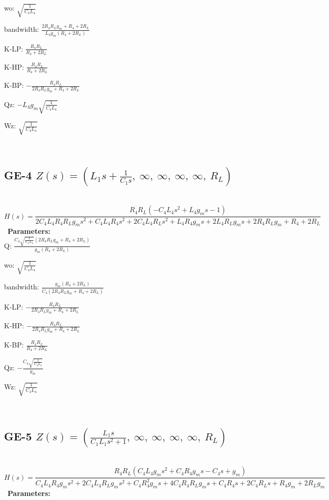 \documentclass{article}
\begin{document}
wo: $\sqrt{\frac{1}{C_{4} L_{4}}}$\ 

bandwidth: $\frac{2 R_{4} R_{L} g_{m} + R_{4} + 2 R_{L}}{L_{4} g_{m} \left(R_{4} + 2 R_{L}\right)}$\ 

K-LP: $\frac{R_{4} R_{L}}{R_{4} + 2 R_{L}}$\ 

K-HP: $\frac{R_{4} R_{L}}{R_{4} + 2 R_{L}}$\ 

K-BP: $- \frac{R_{4} R_{L}}{2 R_{4} R_{L} g_{m} + R_{4} + 2 R_{L}}$\ 

Qz: $- L_{4} g_{m} \sqrt{\frac{1}{C_{4} L_{4}}}$\ 

Wz: $\sqrt{\frac{1}{C_{4} L_{4}}}$\ 

\ 

\subsection{GE-4 $Z(s) = \left( L_{1} s + \frac{1}{C_{1} s}, \  \infty, \  \infty, \  \infty, \  \infty, \  R_{L}\right)$ } \ 
\textbf{\[H(s) = \frac{R_{4} R_{L} \left(- C_{4} L_{4} s^{2} + L_{4} g_{m} s - 1\right)}{2 C_{4} L_{4} R_{4} R_{L} g_{m} s^{2} + C_{4} L_{4} R_{4} s^{2} + 2 C_{4} L_{4} R_{L} s^{2} + L_{4} R_{4} g_{m} s + 2 L_{4} R_{L} g_{m} s + 2 R_{4} R_{L} g_{m} + R_{4} + 2 R_{L}}\] } \ 
\textbf{Parameters:}\\ 

Q: $\frac{C_{4} \sqrt{\frac{1}{C_{4} L_{4}}} \left(2 R_{4} R_{L} g_{m} + R_{4} + 2 R_{L}\right)}{g_{m} \left(R_{4} + 2 R_{L}\right)}$\ 

wo: $\sqrt{\frac{1}{C_{4} L_{4}}}$\ 

bandwidth: $\frac{g_{m} \left(R_{4} + 2 R_{L}\right)}{C_{4} \left(2 R_{4} R_{L} g_{m} + R_{4} + 2 R_{L}\right)}$\ 

K-LP: $- \frac{R_{4} R_{L}}{2 R_{4} R_{L} g_{m} + R_{4} + 2 R_{L}}$\ 

K-HP: $- \frac{R_{4} R_{L}}{2 R_{4} R_{L} g_{m} + R_{4} + 2 R_{L}}$\ 

K-BP: $\frac{R_{4} R_{L}}{R_{4} + 2 R_{L}}$\ 

Qz: $- \frac{C_{4} \sqrt{\frac{1}{C_{4} L_{4}}}}{g_{m}}$\ 

Wz: $\sqrt{\frac{1}{C_{4} L_{4}}}$\ 

\ 

\subsection{GE-5 $Z(s) = \left( \frac{L_{1} s}{C_{1} L_{1} s^{2} + 1}, \  \infty, \  \infty, \  \infty, \  \infty, \  R_{L}\right)$ } \ 
\textbf{\[H(s) = \frac{R_{4} R_{L} \left(C_{4} L_{4} g_{m} s^{2} + C_{4} R_{4} g_{m} s - C_{4} s + g_{m}\right)}{C_{4} L_{4} R_{4} g_{m} s^{2} + 2 C_{4} L_{4} R_{L} g_{m} s^{2} + C_{4} R_{4}^{2} g_{m} s + 4 C_{4} R_{4} R_{L} g_{m} s + C_{4} R_{4} s + 2 C_{4} R_{L} s + R_{4} g_{m} + 2 R_{L} g_{m}}\] } \ 
\textbf{Parameters:}\\ 
\end{document}
